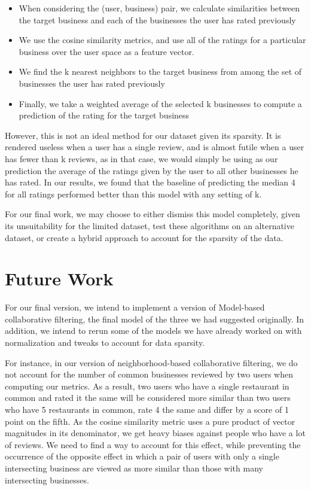 \documentclass[10pt, letterpaper]{article}
\begin{document}
\begin{itemize}
\item When considering the (user, business) pair, we calculate similarities
  between the target business and each of the businesses the user has
  rated previously
\item We use the cosine similarity metrics, and
  use all of the ratings for a particular business over the user space as
  a feature vector.
\item We find the k nearest neighbors to the target business from among
  the set of businesses the user has rated previously
\item Finally, we take a weighted average of the selected k businesses to
  compute a prediction of the rating for the target business 
\end{itemize}

However, this is not an ideal method for our dataset given its
sparsity. It is rendered useless when a user has a single review, and is
almost futile when a user has fewer than k reviews, as in that case, we
would simply be using as our prediction the average of the ratings
given by the user to all other businesses he has rated. In our results,
we found that the baseline of predicting the median 4 for all ratings
performed better than this model with any setting of k. 

For our final work, we may choose to either dismiss this model completely,
given its unsuitability for the limited dataset, test these algorithms on
an alternative dataset, or create a hybrid approach to account for the
sparsity of the data.

\section{Future Work}

For our final version, we intend to implement a version of Model-based
collaborative filtering, the final model of the three we had suggested
originally. In addition, we intend to rerun some of the models we have
already worked on with normalization and tweaks to account for data
sparsity.

For instance, in our version of neighborhood-based collaborative
filtering, we do not account for the number of common businesses reviewed
by two users when computing our metrics. As a result, two users who have a
single restaurant in common and rated it the same will be considered more
similar than two users who have 5 restaurants in common, rate 4 the same
and differ by a score of 1 point on the fifth. As the cosine similarity
metric uses a pure product of vector magnitudes in its denominator, we get
heavy biases against people who have a lot of reviews. We need to
find a way to account for this effect, while preventing the occurrence of
the opposite effect in which a pair of users with only a single
intersecting business are viewed as more similar than those with many
intersecting businesses.
\end{document}

